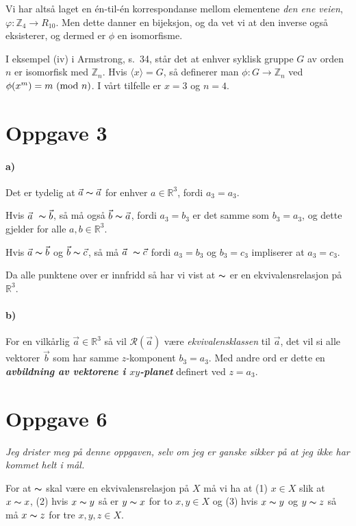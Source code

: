 \documentclass[a4paper,norsk,twocolumn,10pt]{article}
\begin{document}
Vi har altså laget en én-til-én korrespondanse mellom elementene \textit{den
ene veien}, $\varphi\colon \mathbb{Z}_4 \rightarrow R_{10}$. Men dette danner
en bijeksjon, og da vet vi at den inverse også eksisterer, og dermed er $\phi$
en isomorfisme.

I eksempel (iv) i Armstrong, s.~34, står det at enhver syklisk gruppe $G$ av
orden $n$ er isomorfisk med $\mathbb{Z}_n$. Hvis $\langle x \rangle = G$, så
definerer man $\phi\colon G \rightarrow \mathbb{Z}_n$ ved $\phi{(x^m)} = m
\ (\text{mod}\ n)$. I vårt tilfelle er $x=3$ og $n=4$.

\section*{Oppgave 3}
\paragraph{\textbf{a)}}
Det er tydelig at $\vec{a} \thicksim \vec{a}$ for enhver $a\in \mathbb{R}^3$,
fordi $a_3=a_3$.

Hvis $\vec{a} \thicksim \vec{b}$, så må også $\vec{b} \thicksim \vec{a}$, fordi
$a_3=b_3$ er det samme som $b_3=a_3$, og dette gjelder for alle $a,b \in
\mathbb{R}^3$.

Hvis $\vec{a} \thicksim \vec{b}$ og $\vec{b} \thicksim \vec{c}$, så må
$\vec{a} \thicksim \vec{c}$ fordi $a_3=b_3$ og $b_3=c_3$ impliserer at
$a_3=c_3$.

Da alle punktene over er innfridd så har vi vist at $\thicksim$ er en
ekvivalensrelasjon på $\mathbb{R}^3$.

\paragraph{\textbf{b)}}
For en vilkårlig $\vec{a} \in \mathbb{R}^3$ så vil $\mathscr{R}(\vec{a})$ være
\textit{ekvivalensklassen} til $\vec{a}$, det vil si alle vektorer $\vec{b}$
som har samme $z$-komponent $b_3=a_3$. Med andre ord er dette en
\textbf{\textit{avbildning av vektorene i $xy$-planet}}
definert ved $z=a_3$.

\section*{Oppgave 6}
\textit{Jeg drister meg på denne oppgaven, selv om jeg er ganske sikker på at
jeg ikke har kommet helt i mål.}

For at $\thicksim$ skal være en ekvivalensrelasjon på $X$ må vi ha at (1) $x\in
X$ slik at $x \thicksim x$, (2) hvis $x \thicksim y$ så er $y \thicksim x$ for
to $x,y \in X$ og (3) hvis $x \thicksim y$ og $y \thicksim z$ så må $x
\thicksim z$ for tre $x,y,z \in X$.
\end{document}
